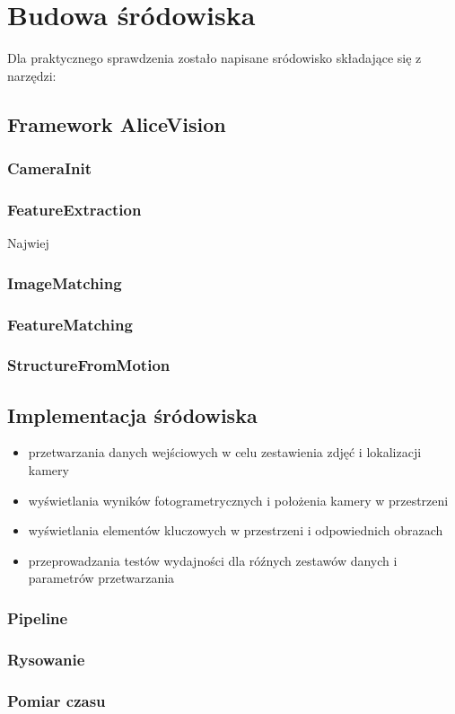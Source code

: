 \chapter{Budowa śródowiska}

Dla praktycznego sprawdzenia zostało napisane sródowisko składające się z narzędzi:


\section{Framework AliceVision}
\subsection{CameraInit}
\subsection{FeatureExtraction}
Najwiej
\subsection{ImageMatching}
\subsection{FeatureMatching}
\subsection{StructureFromMotion}
\section{Implementacja śródowiska}
\begin{itemize}
\item przetwarzania danych wejściowych w celu zestawienia zdjęć i lokalizacji kamery
\item wyświetlania wyników fotogrametrycznych i położenia kamery w przestrzeni
\item wyświetlania elementów kluczowych w przestrzeni i odpowiednich obrazach
\item przeprowadzania testów wydajności dla róźnych zestawów danych i parametrów przetwarzania
\end{itemize}

\subsection{Pipeline}
\subsection{Rysowanie}
\subsection{Pomiar czasu}
